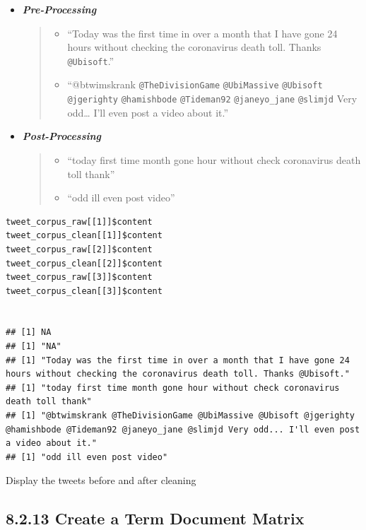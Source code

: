 \documentclass[11pt]{article}
\begin{document}
\begin{itemize}
\item \textbf{\emph{Pre-Processing}}
\begin{quote}
\begin{itemize}
\item ``Today was the first time in over a month that I have gone 24 hours without
checking the coronavirus death toll. Thanks \texttt{@Ubisoft}.''

\item ``@btwimskrank \texttt{@TheDivisionGame} \texttt{@UbiMassive} \texttt{@Ubisoft} \texttt{@jgerighty} \texttt{@hamishbode}
\texttt{@Tideman92} \texttt{@janeyo\_jane} \texttt{@slimjd} Very odd\ldots{} I'll even post a video about it.''
\end{itemize}
\end{quote}
\item \textbf{\emph{Post-Processing}}
\begin{quote}
\begin{itemize}
\item ``today first time month gone hour without check coronavirus death toll thank''

\item ``odd ill even post video''
\end{itemize}
\end{quote}
\end{itemize}

\begin{listing}[htbp]
\begin{verbatim}
tweet_corpus_raw[[1]]$content
tweet_corpus_clean[[1]]$content
tweet_corpus_raw[[2]]$content
tweet_corpus_clean[[2]]$content
tweet_corpus_raw[[3]]$content
tweet_corpus_clean[[3]]$content


## [1] NA
## [1] "NA"
## [1] "Today was the first time in over a month that I have gone 24 hours without checking the coronavirus death toll. Thanks @Ubisoft."
## [1] "today first time month gone hour without check coronavirus death toll thank"
## [1] "@btwimskrank @TheDivisionGame @UbiMassive @Ubisoft @jgerighty @hamishbode @Tideman92 @janeyo_jane @slimjd Very odd... I'll even post a video about it."
## [1] "odd ill even post video"
\end{verbatim}
\caption{\label{org2a337cb}Display the tweets before and after cleaning}
\end{listing}


\subsection{8.2.13 Create a Term Document Matrix}
\label{sec:orga4bec2c}
\end{document}
